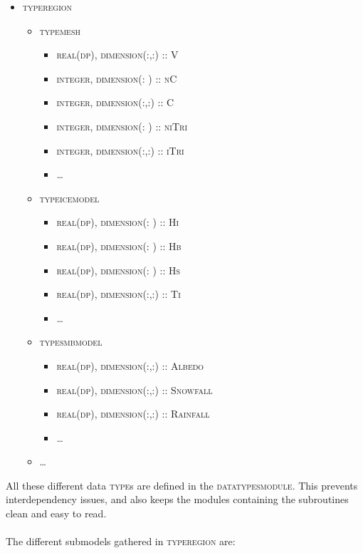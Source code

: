 \documentclass{article}
\begin{document}
\begin{itemize}
  \item \textsc{type\textunderscore region}
  \begin{itemize}
  
    \item \textsc{type\textunderscore mesh}
    \begin{itemize}
      \item \textsc{real(dp), dimension(:,:) :: V}
      \item \textsc{integer, dimension(:  ) :: nC}
      \item \textsc{integer, dimension(:,:) :: C}
      \item \textsc{integer, dimension(:  ) :: niTri}
      \item \textsc{integer, dimension(:,:) :: iTri}
      \item \ldots
    \end{itemize}
  
    \item \textsc{type\textunderscore ice\textunderscore model}
    \begin{itemize}
      \item \textsc{real(dp), dimension(:  ) :: Hi}
      \item \textsc{real(dp), dimension(:  ) :: Hb}
      \item \textsc{real(dp), dimension(:  ) :: Hs}
      \item \textsc{real(dp), dimension(:,:) :: Ti}
      \item \ldots
    \end{itemize}
    
    \item \textsc{type\textunderscore smb\textunderscore model}
    \begin{itemize}
      \item \textsc{real(dp), dimension(:,:) :: Albedo}
      \item \textsc{real(dp), dimension(:,:) :: Snowfall}
      \item \textsc{real(dp), dimension(:,:) :: Rainfall}
      \item \ldots
    \end{itemize}
    
    \item \textsc{\ldots}
      
  \end{itemize}
\end{itemize}

All these different data \textsc{type}s are defined in the \textsc{data\textunderscore types\textunderscore module}. This prevents interdependency issues, and also keeps the modules containing the subroutines clean and easy to read.\\
\\
The different submodels gathered in \textsc{type\textunderscore region} are:
\end{document}
